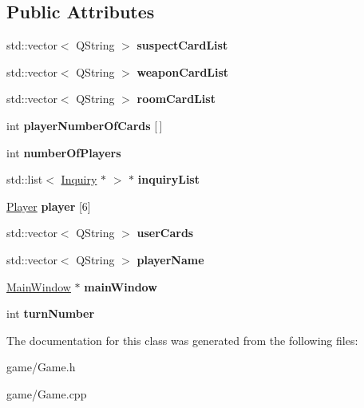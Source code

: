 \subsection*{Public Attributes}
\begin{DoxyCompactItemize}
\item 
\mbox{\label{classGame_a56722c14897977da3ce6f1c943ddf50c}} 
std\+::vector$<$ Q\+String $>$ {\bfseries suspect\+Card\+List}
\item 
\mbox{\label{classGame_a4a9b27671eb4fb9bfc3009f0d40fb166}} 
std\+::vector$<$ Q\+String $>$ {\bfseries weapon\+Card\+List}
\item 
\mbox{\label{classGame_ad5580ea737b17ee1395c4ce1e32fd768}} 
std\+::vector$<$ Q\+String $>$ {\bfseries room\+Card\+List}
\item 
\mbox{\label{classGame_a1ad40bceba6677495abaaff2d93c497e}} 
int {\bfseries player\+Number\+Of\+Cards} \mbox{[}$\,$\mbox{]}
\item 
\mbox{\label{classGame_a250428392614fc7c7e3f800c5aac9aff}} 
int {\bfseries number\+Of\+Players}
\item 
\mbox{\label{classGame_a5a6e3c17489efac45233441a0587aff3}} 
std\+::list$<$ \hyperlink{classInquiry}{Inquiry} $\ast$ $>$ $\ast$ {\bfseries inquiry\+List}
\item 
\mbox{\label{classGame_a3adf091eefcc1f00ee02270925b8613e}} 
\hyperlink{classPlayer}{Player} {\bfseries player} \mbox{[}6\mbox{]}
\item 
\mbox{\label{classGame_a0f4493e06767d8ac4c9b78cfe35b6210}} 
std\+::vector$<$ Q\+String $>$ {\bfseries user\+Cards}
\item 
\mbox{\label{classGame_a1eea28b69b94947bea0dc07c296f165f}} 
std\+::vector$<$ Q\+String $>$ {\bfseries player\+Name}
\item 
\mbox{\label{classGame_a8dd6e7ba15211d74ed820475cfc0c1e0}} 
\hyperlink{classMainWindow}{Main\+Window} $\ast$ {\bfseries main\+Window}
\item 
\mbox{\label{classGame_a05b65cad55a48f8aa9de08e5ef12da8c}} 
int {\bfseries turn\+Number}
\end{DoxyCompactItemize}


The documentation for this class was generated from the following files\+:\begin{DoxyCompactItemize}
\item 
game/Game.\+h\item 
game/Game.\+cpp\end{DoxyCompactItemize}
